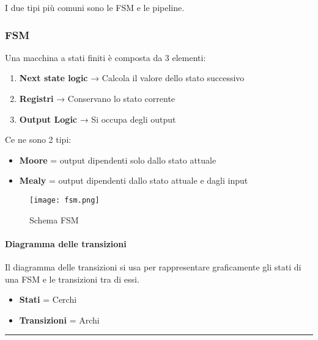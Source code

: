 \documentclass{article}
\begin{document}
\vspace{5pt}

I due tipi più comuni sono le FSM e le pipeline.

\newpage

\subsubsection{FSM}

Una macchina a stati finiti è composta da 3 elementi:
\begin{enumerate}
    \item \textbf{Next state logic} → Calcola il valore dello stato successivo
    \item \textbf{Registri} → Conservano lo stato corrente
    \item \textbf{Output Logic} → Si occupa degli output
            
\end{enumerate}

\vspace{5pt}

Ce ne sono 2 tipi:
\begin{itemize}
    \item \textbf{Moore} = output dipendenti solo dallo stato attuale
    \item \textbf{Mealy} = output dipendenti dallo stato attuale e dagli input
\end{itemize}

\begin{figure}[ht]
    \centering
    \texttt{[image: fsm.png]}
    \caption{Schema FSM}
    \label{fig:fsm}
\end{figure}

\paragraph{Diagramma delle transizioni}

Il diagramma delle transizioni si usa per rappresentare graficamente gli stati di una FSM e le transizioni tra di essi.

\begin{itemize}
    \item \textbf{Stati} = Cerchi
    \item \textbf{Transizioni} = Archi
\end{itemize}

\newpage

\noindent\rule{\textwidth}{0.5pt}
\end{document}

